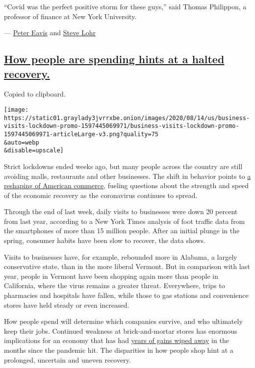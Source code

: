 ``Covid was the perfect positive storm for these guys,'' said Thomas
Philippon, a professor of finance at New York University.

--- \href{https://www.nytimes3xbfgragh.onion/by/peter-eavis}{Peter
Eavis} and \href{https://www.nytimes3xbfgragh.onion/by/steve-lohr}{Steve
Lohr}

\hypertarget{how-people-are-spending-hints-at-a-halted-recovery}{%
\subsection{\texorpdfstring{\protect\hyperlink{how-people-are-spending-hints-at-a-halted-recovery}{How
people are spending hints at a halted
recovery.}}{How people are spending hints at a halted recovery.}}\label{how-people-are-spending-hints-at-a-halted-recovery}}

Copied to clipboard.

\texttt{[image: https://static01.graylady3jvrrxbe.onion/images/2020/08/14/us/business-visits-lockdown-promo-1597445069971/business-visits-lockdown-promo-1597445069971-articleLarge-v3.png?quality=75\\\&auto=webp\\\&disable=upscale]}

Strict lockdowns ended weeks ago, but many people across the country are
still avoiding malls, restaurants and other businesses. The shift in
behavior points to
\href{https://www.nytimes3xbfgragh.onion/interactive/2020/08/18/business/economy/coronavirus-economic-recovery-states.html}{a
reshaping of American commerce}, fueling questions about the strength
and speed of the economic recovery as the coronavirus continues to
spread.

Through the end of last week, daily visits to businesses were down 20
percent from last year, according to a New York Times analysis of foot
traffic data from the smartphones of more than 15 million people. After
an initial plunge in the spring, consumer habits have been slow to
recover, the data shows.

Visits to businesses have, for example, rebounded more in Alabama, a
largely conservative state, than in the more liberal Vermont. But in
comparison with last year, people in Vermont have been shopping again
more than people in California, where the virus remains a greater
threat. Everywhere, trips to pharmacies and hospitals have fallen, while
those to gas stations and convenience stores have held steady or even
increased.

How people spend will determine which companies survive, and who
ultimately keep their jobs. Continued weakness at brick-and-mortar
stores has enormous implications for an economy that has had
\href{https://www.nytimes3xbfgragh.onion/2020/07/30/business/economy/q2-gdp-coronavirus-economy.html}{years
of gains wiped away} in the months since the pandemic hit. The
disparities in how people shop hint at a prolonged, uncertain and uneven
recovery.

